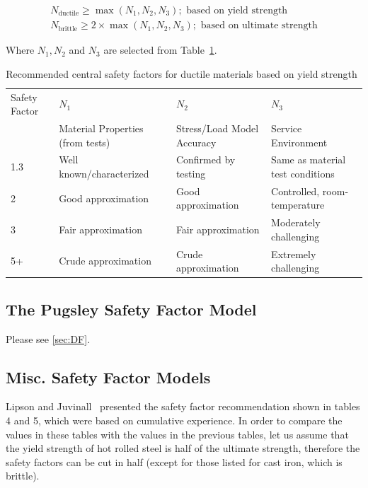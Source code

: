\begin{eqnarray}
  N_{\text{ductile}} \geq \max(N_1, N_2, N_3); \text{ based on yield strength} \\
  N_{\text{brittle}} \geq 2\times\max(N_1, N_2, N_3); \text{ based on ultimate strength}
\end{eqnarray}

\noindent Where $N_1, N_2$ and $N_3$ are selected from Table~\ref{tbl-norton}.

\begin{table}
  \centering
  \small
  \begin{tabular}{p{} p{} p{} p{}}
    \toprule
      Safety Factor & $N_1$ & $N_2$ & $N_3$ \\
      & Material Properties (from tests) & Stress/Load Model Accuracy & Service Environment \\
    \midrule
    1.3 & Well known/characterized & Confirmed by testing & Same as material test conditions \\
    2 & Good approximation & Good approximation & Controlled, room-temperature \\
    3 & Fair approximation & Fair approximation & Moderately challenging \\
    5+ & Crude approximation & Crude approximation & Extremely challenging\\
    \bottomrule
  \end{tabular}
  \label{tbl-norton}
  \caption[Recommended central safety factors for ductile materials based on yield strength]{Recommended central safety factors for ductile materials based on yield strength~\citep{robert2006}}
\end{table}

\subsection{The Pugsley Safety Factor Model}

Please see \cref{sec:DF}.

\subsection{Misc. Safety Factor Models}

Lipson and Juvinall~\cite{lipson1963} presented the safety factor recommendation shown in tables 4 and 5, which were based on cumulative experience. In order to compare the values in these tables with the values in the previous tables, let us assume that the yield strength of hot rolled steel is half of the ultimate strength, therefore the safety factors can be cut in half (except for those listed for cast iron, which is brittle).

